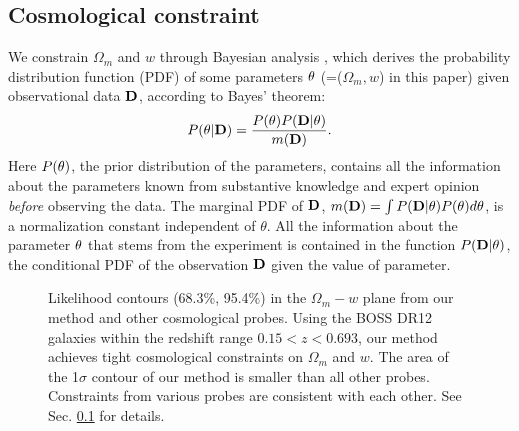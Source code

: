 \documentclass[iop]{emulateapj}
\begin{document}


\subsection{Cosmological constraint}\label{sec:constraint}




We constrain $\Omega_m$ and $w$ through Bayesian analysis \citep{Bayesian},
which derives the probability distribution function (PDF) of some parameters $\bf \theta$ (=($\Omega_m,w$) in this paper)
given observational data $\bf D$, 
according to Bayes' theorem:
\begin{equation}
 P({\bf \theta}|{\bf D}) = \frac{P({\bf \theta})P({\bf D}|{\bf \theta})}{m({\bf D})}.
\end{equation}
Here $P(\bf \theta)$, the prior distribution of the parameters,
contains all the information about the parameters known from substantive knowledge 
and expert opinion {\it before} observing the data.
The marginal PDF of $\bf D$, 
$m({\bf D})=\int P({\bf D|\theta})P({\bf \theta})d{\bf \theta}$, 
is a normalization constant independent of $\theta$.
All the information about the parameter $\bf \theta$ that stems from the experiment
is contained in the function $P({\bf D}|{\bf \theta})$, 
the conditional PDF of the observation $\bf D$ given the value of parameter.

\begin{figure}
   \caption{\label{fig_contours}
   Likelihood contours (68.3\%, 95.4\%) in the $\Omega_m-w$ plane from our method and other cosmological probes.
   Using the BOSS DR12 galaxies within the redshift range $0.15< z< 0.693$, our method achieves tight cosmological constraints on $\Omega_m$ and $w$.
   The area of the 1$\sigma$ contour of our method is smaller than all other probes.
   Constraints from various probes are consistent with each other.
   See Sec. \ref{sec:constraint} for details.
   }
\end{figure}
\end{document}
